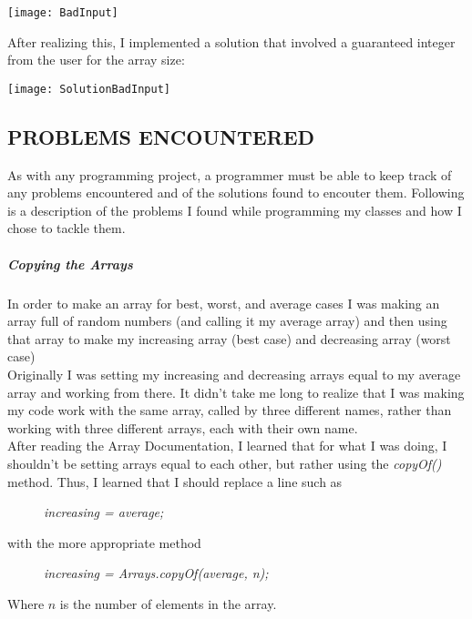 \documentclass[12pt]{article}
\begin{document}
	\texttt{[image: BadInput]}
	\vspace*{.5in}
	
	After realizing this, I implemented a solution that involved a guaranteed integer from the user for the array size: 
	
	\texttt{[image: SolutionBadInput]}
	\vspace*{.5in}

	

\subsection*{PROBLEMS ENCOUNTERED}

As with any programming project, a programmer must be able to keep track of any problems encountered and of the solutions found to encouter them. Following is a description of the problems I found while programming my classes and how I chose to tackle them. 

\subparagraph{Copying the Arrays}
In order to make an array for best, worst, and average cases I was making an array full of random numbers (and calling it my average array) and then using that array to make my increasing array (best case) and decreasing array (worst case) \\

Originally I was setting my increasing and decreasing arrays equal to my average array and working from there. It didn't take me long to realize that I was making my code work with the same array, called by three different names, rather than working with three different arrays, each with their own name. \\

After reading the Array Documentation, I learned that for what I was doing, I shouldn't be setting arrays equal to each other, but rather using the \textit{copyOf()} method. Thus, I learned that I should replace a line such as 
\begin{description}
	\item[] \textit{increasing = average;}
\end{description}	

\noindent with the more appropriate method

\begin{description}
	 \item[] \textit{increasing = Arrays.copyOf(average, n);}
 \end{description}
 Where $n$ is the number of elements in the array.
\end{document}
